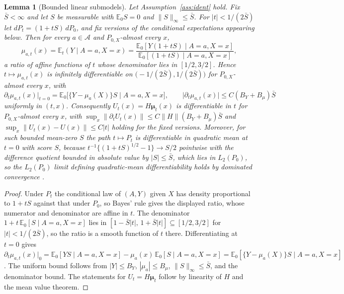 \documentclass[11pt]{article}
\newtheorem{lemma}{Lemma}
\newcommand{\E}{\mathbb E}
\newcommand{\calA}{\mathcal A}
\newcommand{\bmu}{\bm\mu}
\newcommand{\norm}[1]{\lVert #1\rVert}
\begin{document}
\begin{lemma}[Bounded linear submodels]\label{lem:submodel}
Let Assumption~\ref{ass:ident} hold. Fix $\bar S<\infty$ and let $S$ be measurable with $\E_0S=0$ and $\norm{S}_\infty\le\bar S$. For $|t|<1/(2\bar S)$ let $dP_t=(1+tS)\,dP_0$, and fix versions of the conditional expectations appearing below. Then for every $a\in\calA$ and $P_{0,X}$-almost every $x$,
\begin{equation*}
\mu_{a,t}(x)=\E_t(Y\mid A=a,X=x)=\frac{\E_0[Y(1+tS)\mid A=a,X=x]}{\E_0[(1+tS)\mid A=a,X=x]},
\end{equation*}
a ratio of affine functions of $t$ whose denominator lies in $[1/2,3/2]$. Hence $t\mapsto\mu_{a,t}(x)$ is infinitely differentiable on $\bigl(-1/(2\bar S),1/(2\bar S)\bigr)$ for $P_{0,X}$-almost every $x$, with
\begin{equation*}
\partial_t\mu_{a,t}(x)\big|_{t=0}=\E_0\bigl[\{Y-\mu_a(X)\}S\mid A=a,X=x\bigr],
\qquad
\bigl|\partial_t\mu_{a,t}(x)\bigr|\le C(B_Y+B_\mu)\bar S
\end{equation*}
uniformly in $(t,x)$. Consequently $U_t(x)=H\bmu_t(x)$ is differentiable in $t$ for $P_{0,X}$-almost every $x$, with $\sup_x\norm{\partial_tU_t(x)}\le C\norm{H}(B_Y+B_\mu)\bar S$ and $\sup_x\norm{U_t(x)-U(x)}\le C|t|$ holding for the fixed versions. Moreover, for such bounded mean-zero $S$ the path $t\mapsto P_t$ is differentiable in quadratic mean at $t=0$ with score $S$, because $t^{-1}\{(1+tS)^{1/2}-1\}\to S/2$ pointwise with the difference quotient bounded in absolute value by $|S|\le\bar S$, which lies in $L_2(P_0)$, so the $L_2(P_0)$ limit defining quadratic-mean differentiability holds by dominated convergence \citep[Chapter~25]{vandervaart1998}.
\end{lemma}

\begin{proof}
Under $P_t$ the conditional law of $(A,Y)$ given $X$ has density proportional to $1+tS$ against that under $P_0$, so Bayes' rule gives the displayed ratio, whose numerator and denominator are affine in $t$. The denominator $1+t\,\E_0[S\mid A=a,X=x]$ lies in $[1-\bar S|t|,\,1+\bar S|t|]\subseteq[1/2,3/2]$ for $|t|<1/(2\bar S)$, so the ratio is a smooth function of $t$ there. Differentiating at $t=0$ gives $\partial_t\mu_{a,t}(x)|_{0}=\E_0[YS\mid A=a,X=x]-\mu_a(x)\,\E_0[S\mid A=a,X=x]=\E_0[\{Y-\mu_a(X)\}S\mid A=a,X=x]$. The uniform bound follows from $|Y|\le B_Y$, $|\mu_a|\le B_\mu$, $\norm{S}_\infty\le\bar S$, and the denominator bound. The statements for $U_t=H\bmu_t$ follow by linearity of $H$ and the mean value theorem.
\end{proof}
\end{document}
